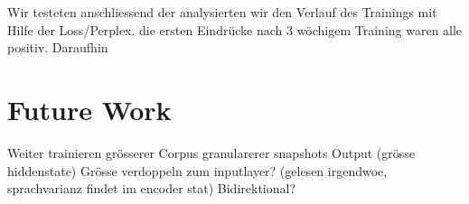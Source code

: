 Wir testeten anschliessend der analysierten wir den Verlauf des Trainings mit Hilfe der Loss/Perplex. die ersten Eindrücke nach 3 wöchigem Training waren alle positiv. Daraufhin
\chapter{Future Work}
Weiter trainieren
grösserer Corpus
granularerer snapshots
Output (grösse hiddenstate) Grösse verdoppeln zum inputlayer? (gelesen irgendwoe, sprachvarianz findet im encoder stat)
Bidirektional?